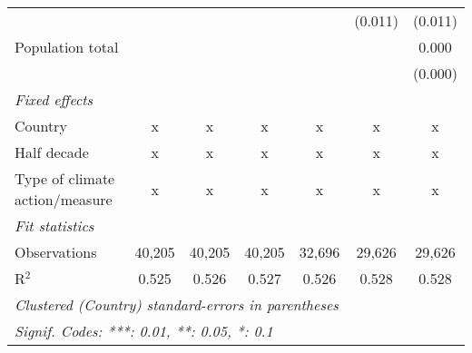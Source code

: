 \begin{tabular}{lcccccc}
                                                                                        &         &               &                &                & (0.011)       & (0.011)\\   
   Population total                                                                     &         &               &                &                &               & 0.000\\   
                                                                                        &         &               &                &                &               & (0.000)\\   
   \emph{Fixed effects}\\
   Country                                                                              & x       & x             & x              & x              & x             & x\\  
   Half decade                                                                          & x       & x             & x              & x              & x             & x\\  
   Type of climate action/measure                                                       & x       & x             & x              & x              & x             & x\\  
   \midrule \emph{Fit statistics}\\
   Observations                                                                         & 40,205  & 40,205        & 40,205         & 32,696         & 29,626        & 29,626\\  
   R$^2$                                                                                & 0.525   & 0.526         & 0.527          & 0.526          & 0.528         & 0.528\\  
   \midrule
   \multicolumn{7}{l}{\emph{Clustered (Country) standard-errors in parentheses}}\\
   \multicolumn{7}{l}{\emph{Signif. Codes: ***: 0.01, **: 0.05, *: 0.1}}\\
\end{tabular}
\par\endgroup


